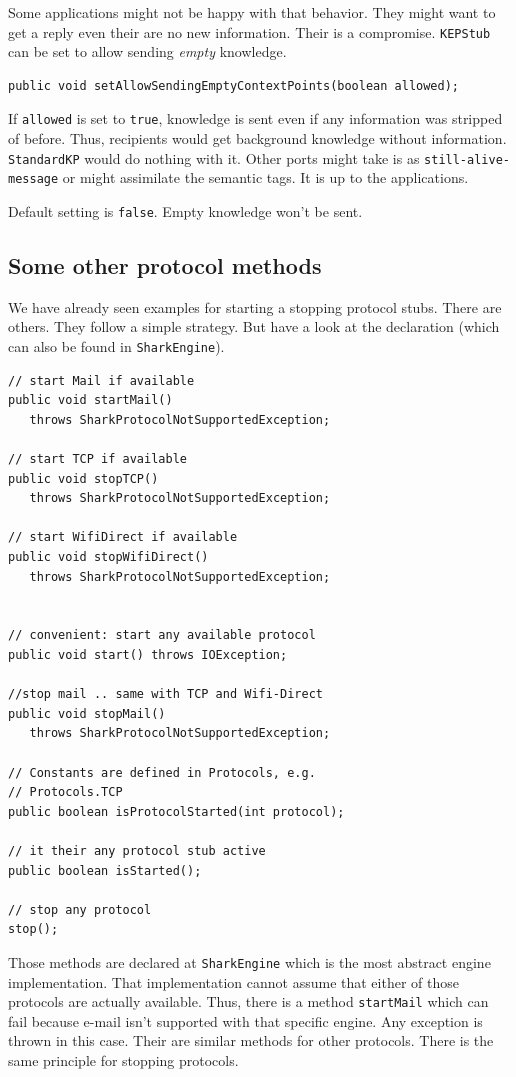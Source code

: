 Some applications might not be happy with that behavior. They might want to get a reply even their are no new information. Their is a compromise. {\tt KEPStub} can be set to allow sending {\it empty} knowledge.

\begin{verbatim}
public void setAllowSendingEmptyContextPoints(boolean allowed);
\end{verbatim}

If {\tt allowed} is set to {\tt true}, knowledge is sent even if any information was stripped of before. Thus, recipients would get background knowledge without information. {\tt StandardKP} would do nothing with it. Other ports might take is as {\tt still-alive-message} or might assimilate the semantic tags. It is up to the applications.

Default setting is {\tt false}. Empty knowledge won't be sent.

\subsection{Some other protocol methods}
We have already seen examples for starting a stopping protocol stubs. 
There are others. They follow a simple strategy. But have a look at the
declaration (which can also be found in {\tt SharkEngine}).

\begin{verbatim}
// start Mail if available
public void startMail()
   throws SharkProtocolNotSupportedException;

// start TCP if available
public void stopTCP() 
   throws SharkProtocolNotSupportedException;

// start WifiDirect if available
public void stopWifiDirect() 
   throws SharkProtocolNotSupportedException;


// convenient: start any available protocol
public void start() throws IOException;

//stop mail .. same with TCP and Wifi-Direct
public void stopMail()
   throws SharkProtocolNotSupportedException;

// Constants are defined in Protocols, e.g.
// Protocols.TCP
public boolean isProtocolStarted(int protocol);

// it their any protocol stub active
public boolean isStarted();

// stop any protocol
stop();
\end{verbatim}

Those methods are declared at {\tt SharkEngine} which is the most
abstract engine implementation. That implementation cannot assume that
either of those protocols are actually available. Thus, there is a
method {\tt startMail} which can fail because e-mail isn't supported with 
that specific engine. Any exception is thrown in this case. Their are
similar methods for other protocols. There is the same principle for stopping protocols. 


